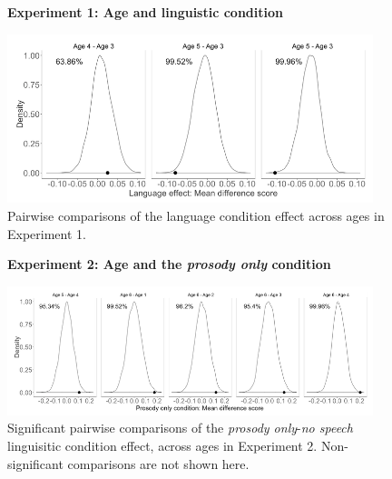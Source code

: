 \documentclass[authoryear, 12pt]{elsarticle}
\begin{document}
\begin{figure}
\begin{center}
\textbf{Experiment 1: Age and linguistic condition}\par\medskip
\includegraphics[width=0.95\textwidth]{figures/E1-child-randvsreal-ttest-agebylg.png}
\end{center}
\caption{Pairwise comparisons of the language condition effect across ages in Experiment 1.} 
\label{fig:E1-lgageinteraction}
\end{figure}

\begin{figure}
\begin{center}
\textbf{Experiment 2: Age and the \textit{prosody only} condition}\par\medskip
\includegraphics[width=0.95\textwidth]{figures/E2-child-randvsreal-ttest-muffledages.png}
\end{center}
\caption{Significant pairwise comparisons of the \textit{prosody only}-\textit{no speech} linguisitic condition effect, across ages in Experiment 2. Non-significant comparisons are not shown here.} 
\label{fig:E2-lgageinteraction}
\end{figure}
\end{document}
